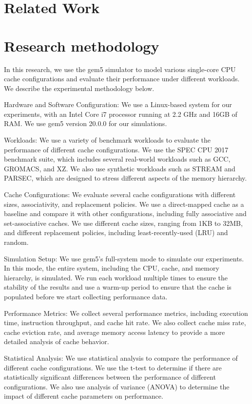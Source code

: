 \documentclass[conference]{IEEEtran}
\begin{document}
\section{Related Work}



\section{Research methodology}
In this research, we use the gem5 simulator to model various single-core CPU cache configurations and evaluate their performance under different workloads. We describe the experimental methodology below.

Hardware and Software Configuration:
We use a Linux-based system for our experiments, with an Intel Core i7 processor running at 2.2 GHz and 16GB of RAM. We use gem5 version 20.0.0 for our simulations.

Workloads:
We use a variety of benchmark workloads to evaluate the performance of different cache configurations. We use the SPEC CPU 2017 benchmark suite, which includes several real-world workloads such as GCC, GROMACS, and XZ. We also use synthetic workloads such as STREAM and PARSEC, which are designed to stress different aspects of the memory hierarchy.

Cache Configurations:
We evaluate several cache configurations with different sizes, associativity, and replacement policies. We use a direct-mapped cache as a baseline and compare it with other configurations, including fully associative and set-associative caches. We use different cache sizes, ranging from 1KB to 32MB, and different replacement policies, including least-recently-used (LRU) and random.

Simulation Setup:
We use gem5's full-system mode to simulate our experiments. In this mode, the entire system, including the CPU, cache, and memory hierarchy, is simulated. We run each workload multiple times to ensure the stability of the results and use a warm-up period to ensure that the cache is populated before we start collecting performance data.

Performance Metrics:
We collect several performance metrics, including execution time, instruction throughput, and cache hit rate. We also collect cache miss rate, cache eviction rate, and average memory access latency to provide a more detailed analysis of cache behavior.

Statistical Analysis:
We use statistical analysis to compare the performance of different cache configurations. We use the t-test to determine if there are statistically significant differences between the performance of different configurations. We also use analysis of variance (ANOVA) to determine the impact of different cache parameters on performance.
\end{document}
